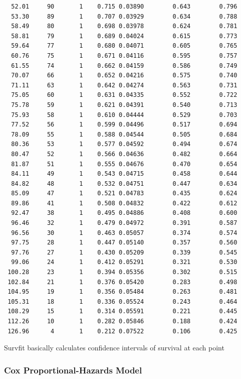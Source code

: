 \documentclass[11pt]{article}
\begin{document}
\begin{verbatim}
  52.01     90       1    0.715 0.03890        0.643        0.796
  53.30     89       1    0.707 0.03929        0.634        0.788
  58.49     80       1    0.698 0.03978        0.624        0.781
  58.81     79       1    0.689 0.04024        0.615        0.773
  59.64     77       1    0.680 0.04071        0.605        0.765
  60.76     75       1    0.671 0.04116        0.595        0.757
  61.55     74       1    0.662 0.04159        0.586        0.749
  70.07     66       1    0.652 0.04216        0.575        0.740
  71.11     63       1    0.642 0.04274        0.563        0.731
  75.05     60       1    0.631 0.04335        0.552        0.722
  75.78     59       1    0.621 0.04391        0.540        0.713
  75.93     58       1    0.610 0.04444        0.529        0.703
  77.52     56       1    0.599 0.04496        0.517        0.694
  78.09     55       1    0.588 0.04544        0.505        0.684
  80.36     53       1    0.577 0.04592        0.494        0.674
  80.47     52       1    0.566 0.04636        0.482        0.664
  81.87     51       1    0.555 0.04676        0.470        0.654
  84.11     49       1    0.543 0.04715        0.458        0.644
  84.82     48       1    0.532 0.04751        0.447        0.634
  85.09     47       1    0.521 0.04783        0.435        0.624
  89.86     41       1    0.508 0.04832        0.422        0.612
  92.47     38       1    0.495 0.04886        0.408        0.600
  96.46     32       1    0.479 0.04972        0.391        0.587
  96.56     30       1    0.463 0.05057        0.374        0.574
  97.75     28       1    0.447 0.05140        0.357        0.560
  97.76     27       1    0.430 0.05209        0.339        0.545
  99.06     24       1    0.412 0.05291        0.321        0.530
 100.28     23       1    0.394 0.05356        0.302        0.515
 102.84     21       1    0.376 0.05420        0.283        0.498
 104.95     19       1    0.356 0.05484        0.263        0.481
 105.31     18       1    0.336 0.05524        0.243        0.464
 108.29     15       1    0.314 0.05591        0.221        0.445
 112.26     10       1    0.282 0.05846        0.188        0.424
 126.96      4       1    0.212 0.07522        0.106        0.425
\end{verbatim}

Survfit basically calculates confidence intervals of survival at each point


\subsubsection{Cox Proportional-Hazards Model}
\label{sec:org32aba7a}
\end{document}
